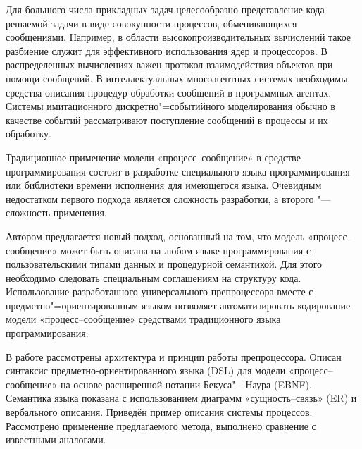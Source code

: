 
\date{18/VII/2014}




\makerutitle




Для большого числа прикладных задач целесообразно представление кода решаемой задачи в виде совокупности процессов, обменивающихся сообщениями. 
Например, в области высокопроизводительных вычислений такое разбиение служит для эффективного использования ядер и процессоров.
В распределенных вычислениях важен протокол взаимодействия объектов при помощи сообщений. 
В интеллектуальных многоагентных системах необходимы средства описания процедур обработки сообщений в программных агентах. 
Системы имитационного дискретно"=событийного моделирования обычно в  качестве событий рассматривают поступление сообщений в процессы и их обработку.

Традиционное применение модели «процесс--сообщение» в средстве программирования состоит в разработке специального языка программирования или библиотеки времени исполнения для имеющегося языка. 
Очевидным недостатком первого подхода является сложность разработки, а второго "--- сложность применения. 

Автором предлагается новый подход, основанный на том, что модель «про\-цесс--сообщение» может быть описана на любом языке программирования с пользовательскими типами данных и процедурной семантикой. 
Для этого необходимо следовать специальным соглашениям на структуру кода. Использование разработанного универсального препроцессора вместе с предметно"=ориентированным языком позволяет автоматизировать кодирование модели «процесс--сообщение» средствами традиционного языка программирования.

В работе рассмотрены архитектура и принцип работы препроцессора. Описан синтаксис предметно-ориентированного языка (DSL) для модели «про\-цесс--сообщение» на основе расширенной нотации Бекуса"--~Наура (EBNF). 
Семантика языка показана с использованием диаграмм «сущность--связь» (ER) и вербального описания. 
Приведён пример описания системы процессов. 
Рассмотрено применение предлагаемого метода, выполнено сравнение с известными аналогами.

\smallskip


